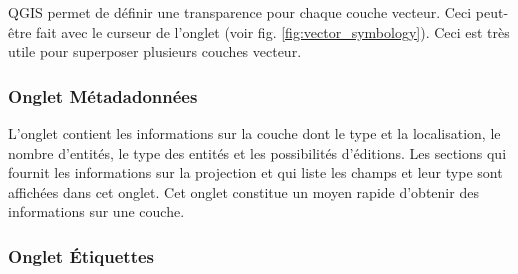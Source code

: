  \label{sec:vect_transparency} 
QGIS \CURRENT permet de définir une transparence pour chaque couche vecteur. Ceci peut-être fait avec le curseur  de l'onglet  (voir fig. \ref{fig:vector_symbology}). Ceci est très utile pour superposer plusieurs couches vecteur.

\subsubsection{Onglet Métadadonnées}

L'onglet  contient les informations sur la couche dont le type et la localisation, le nombre d'entités, le type des entités et les possibilités d'éditions. Les sections  qui fournit les informations sur la projection et  qui liste les champs et leur type sont affichées dans cet onglet. Cet onglet constitue un moyen rapide d'obtenir des informations sur une couche.

\subsubsection{Onglet Étiquettes}

